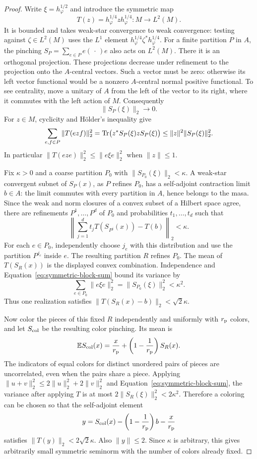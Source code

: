 \begin{proof}
Write $\xi=h_\varphi^{1/2}$ and introduce the symmetric map
\[
 T(z)=h_\varphi^{1/4}z h_\varphi^{1/4}\colon M\longrightarrow L^2(M).
\]
It is bounded and takes weak-star convergence to weak convergence:
testing against $\zeta\in L^2(M)$ uses the $L^1$ element
$h_\varphi^{1/4}\zeta^*h_\varphi^{1/4}$.
For a finite partition $P$ in $A$, the pinching
$S_P=\sum_{e\in P}e(\,\cdot\,)e$ also acts on $L^2(M)$.
There it is an orthogonal projection.  These projections decrease under
refinement to the projection onto the $A$-central vectors.  Such a vector
must be zero: otherwise its left vector functional would be a nonzero
$A$-central normal positive functional.  To see centrality, move a unitary
of $A$ from the left of the vector to its right, where it commutes with
the left action of $M$.  Consequently
\[
 \|S_P(\xi)\|_2\longrightarrow0.
\]
For $z\in M$, cyclicity and H\"older's inequality give
\begin{equation}\label{eq:symmetric-block-sum}
 \sum_{e,f\in P}\|T(ezf)\|_2^2
 =\operatorname{Tr}\bigl(z^*S_P(\xi)zS_P(\xi)\bigr)
 \leq\|z\|^2\|S_P(\xi)\|_2^2.
\end{equation}
In particular $\|T(eze)\|_2^2\leq\|e\xi e\|_2^2$ when $\|z\|\leq1$.

Fix $\kappa>0$ and a coarse partition $P_0$ with
$\|S_{P_0}(\xi)\|_2<\kappa$.
A weak-star convergent subnet of $S_P(x)$, as $P$ refines $P_0$, has a
self-adjoint contraction limit $b\in A$: the limit commutes with every
partition in $A$, hence belongs to the masa.  Since the weak and norm
closures of a convex subset of a Hilbert space agree, there are
refinements $P^1,\ldots,P^d$ of $P_0$ and probabilities $t_1,\ldots,t_d$
such that
\[
 \left\|\sum_{j=1}^d t_jT(S_{P^j}(x))-T(b)\right\|_2<\kappa.
\]
For each $e\in P_0$, independently choose $j_e$ with this distribution
and use the partition $P^{j_e}$ inside $e$.  The resulting partition $R$
refines $P_0$.  The mean of $T(S_R(x))$ is the displayed convex
combination.  Independence and Equation~\eqref{eq:symmetric-block-sum}
bound its variance by
\[
 \sum_{e\in P_0}\|e\xi e\|_2^2
 =\|S_{P_0}(\xi)\|_2^2<\kappa^2.
\]
Thus one realization satisfies
$\|T(S_R(x)-b)\|_2<\sqrt2\kappa$.

Now color the pieces of this fixed $R$ independently and uniformly with
$r_{\rm p}$ colors, and let $S_{\rm col}$ be the resulting color
pinching.  Its mean is
\[
 \mathbb E S_{\rm col}(x)
 =\frac{x}{r_{\rm p}}+\left(1-\frac1{r_{\rm p}}\right)S_R(x).
\]
The indicators of equal colors for distinct unordered pairs of pieces
are uncorrelated, even when the pairs share a piece.  Applying
$\|u+v\|_2^2\leq2\|u\|_2^2+2\|v\|_2^2$ and
Equation~\eqref{eq:symmetric-block-sum}, the variance after applying $T$
is at most $2\|S_R(\xi)\|_2^2<2\kappa^2$.
Therefore a coloring can be chosen so that the self-adjoint element
\[
 y=S_{\rm col}(x)-\left(1-\frac1{r_{\rm p}}\right)b
                     -\frac{x}{r_{\rm p}}
\]
satisfies $\|T(y)\|_2<2\sqrt2\kappa$.
Also $\|y\|\leq2$.  Since $\kappa$ is arbitrary, this gives arbitrarily
small symmetric seminorm with the number of colors already fixed.


\end{proof}
